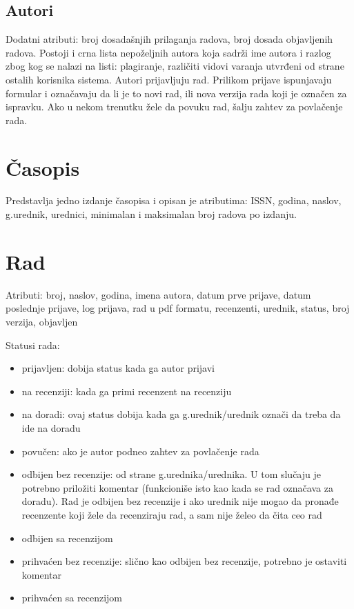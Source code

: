 \documentclass[a4paper,14,4pt]{article}
\begin{document}
    \subsection{Autori}
    Dodatni atributi: broj dosadašnjih prilaganja radova, broj dosada objavljenih radova. Postoji i crna lista nepoželjnih autora koja sadrži ime autora i razlog zbog kog se nalazi na listi:  plagiranje, različiti vidovi varanja utvrđeni od strane ostalih korisnika sistema. Autori prijavljuju rad. Prilikom prijave ispunjavaju formular i označavaju da li je to novi rad, ili nova verzija rada koji je označen za ispravku. Ako u nekom trenutku žele da povuku rad, šalju zahtev za povlačenje rada.

\section{Časopis}
Predstavlja jedno izdanje časopisa i opisan je atributima: ISSN, godina, naslov, g.urednik, urednici, minimalan i maksimalan broj radova po izdanju.

\section{Rad}
    Atributi: broj, naslov, godina, imena autora, datum prve prijave, datum poslednje prijave, log prijava, rad u pdf formatu, recenzenti, urednik, status, broj verzija, objavljen

    Statusi rada:
    \begin{itemize}
        \item prijavljen: dobija status kada ga autor prijavi
        \item na recenziji: kada ga primi recenzent na recenziju
        \item na doradi: ovaj status dobija kada ga g.urednik/urednik označi da treba da ide na doradu
        \item povučen: ako je autor podneo zahtev za povlačenje rada
        \item odbijen bez recenzije: od strane g.urednika/urednika. U tom slučaju je potrebno priložiti komentar (funkcioniše isto kao kada se rad označava za doradu). Rad je odbijen bez recenzije i ako urednik nije mogao da pronađe recenzente koji žele da recenziraju rad, a sam nije želeo da čita ceo rad
        \item odbijen sa recenzijom
        \item prihvaćen bez recenzije: slično kao odbijen bez recenzije, potrebno je ostaviti komentar
        \item prihvaćen sa recenzijom
    \end{itemize}
\end{document}
